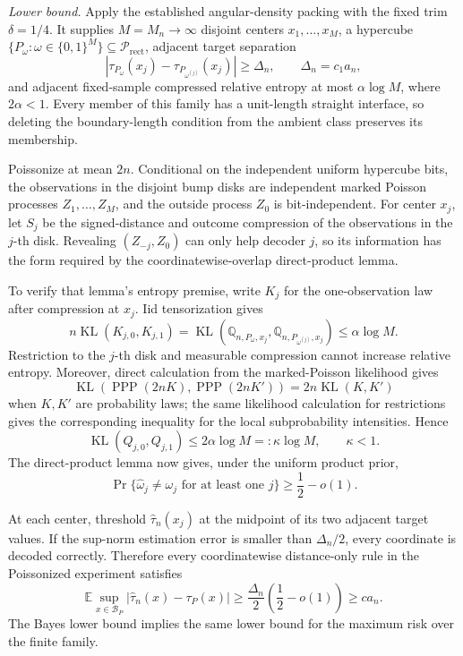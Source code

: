 \emph{Lower bound.}
Apply the established angular-density packing with the fixed trim \(\delta=1/4\).  It supplies \(M=M_n\to\infty\) disjoint centers \(x_1,\ldots,x_M\), a hypercube \(\{P_\omega:\omega\in\{0,1\}^M\}\subseteq\mathcal P_{\mathrm{rect}}\), adjacent target separation
\[
 |\tau_{P_\omega}(x_j)-\tau_{P_{\omega^{(j)}}}(x_j)|\geq\Delta_n,
 \qquad \Delta_n=c_1a_n,
\]
and adjacent fixed-sample compressed relative entropy at most \(\alpha\log M\), where \(2\alpha<1\).  Every member of this family has a unit-length straight interface, so deleting the boundary-length condition from the ambient class preserves its membership.

Poissonize at mean \(2n\).  Conditional on the independent uniform hypercube bits, the observations in the disjoint bump disks are independent marked Poisson processes \(Z_1,\ldots,Z_M\), and the outside process \(Z_0\) is bit-independent.  For center \(x_j\), let \(S_j\) be the signed-distance and outcome compression of the observations in the \(j\)-th disk.  Revealing \((Z_{-j},Z_0)\) can only help decoder \(j\), so its information has the form required by the coordinatewise-overlap direct-product lemma.

To verify that lemma's entropy premise, write \(K_j\) for the one-observation law after compression at \(x_j\).  Iid tensorization gives
\[
 n\operatorname{KL}(K_{j,0},K_{j,1})
 =\operatorname{KL}(\mathbb Q_{n,P_\omega,x_j},
                    \mathbb Q_{n,P_{\omega^{(j)}},x_j})
 \leq\alpha\log M.
\]
Restriction to the \(j\)-th disk and measurable compression cannot increase relative entropy.  Moreover, direct calculation from the marked-Poisson likelihood gives
\[
 \operatorname{KL}(\operatorname{PPP}(2nK),\operatorname{PPP}(2nK'))
 =2n\operatorname{KL}(K,K')
\]
when \(K,K'\) are probability laws; the same likelihood calculation for restrictions gives the corresponding inequality for the local subprobability intensities.  Hence
\[
 \operatorname{KL}(Q_{j,0},Q_{j,1})\leq2\alpha\log M=:\kappa\log M,
 \qquad \kappa<1.
\]
The direct-product lemma now gives, under the uniform product prior,
\[
 \Pr\{\widehat\omega_j\ne\omega_j\text{ for at least one }j\}
 \geq\frac12-o(1).
\]

At each center, threshold \(\widehat\tau_n(x_j)\) at the midpoint of its two adjacent target values.  If the sup-norm estimation error is smaller than \(\Delta_n/2\), every coordinate is decoded correctly.  Therefore every coordinatewise distance-only rule in the Poissonized experiment satisfies
\[
 \mathbb E\sup_{x\in\mathcal B_P}|\widehat\tau_n(x)-\tau_P(x)|
 \geq\frac{\Delta_n}{2}\left(\frac12-o(1)\right)
 \geq ca_n.
\]
The Bayes lower bound implies the same lower bound for the maximum risk over the finite family.

